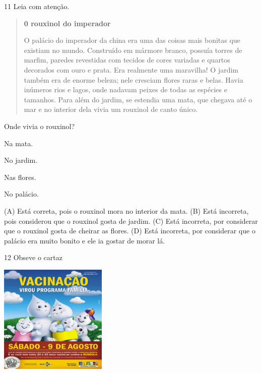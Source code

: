 \num{11} Leia com atenção.

\begin{quote}
\textbf{0 rouxinol do imperador}

O palácio do imperador da china era uma das coisas mais
bonitas que existiam no mundo. Construído em mármore
branco, possuía torres de marfim, paredes revestidas com
tecidos de cores variadas e quartos decorados com ouro e
prata. Era realmente uma maravilha!
O jardim também era de enorme beleza; nele cresciam
flores raras e belas. Havia inúmeros rios e lagos, onde
nadavam peixes de todas as espécies e tamanhos.
Para além do jardim, se estendia uma mata, que
chegava até o mar e no interior dela vivia um rouxinol de
canto único.
\end{quote}


Onde vivia o rouxinol?

\begin{escolha}
\item Na mata.

\item No jardim.

\item Nas flores.

\item No palácio.
\end{escolha}


(A) Está correta, pois o rouxinol mora no interior da mata.
(B) Está incorreta, pois considerou que o rouxinol gosta de jardim.
(C) Está incorreta, por considerar que o rouxinol gosta de cheirar as flores.
(D) Está incorreta, por considerar que o palácio era muito bonito e ele
ia gostar de morar lá.

\num{12} Obseve o cartaz

\includegraphics[width=2.01806in,height=2.05069in]{media/image159.jpeg}

